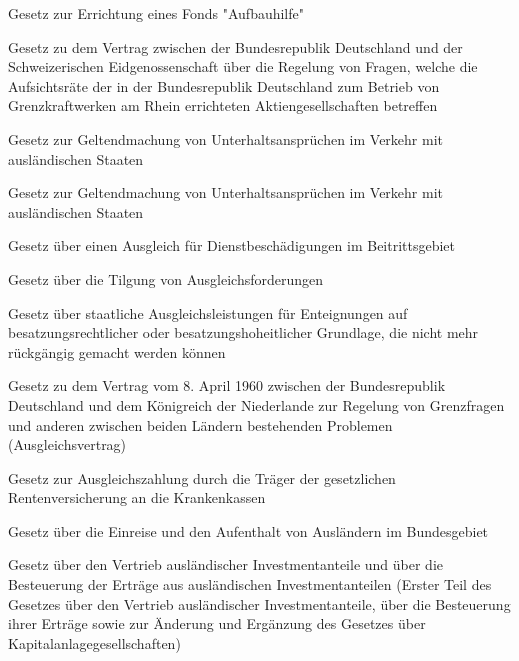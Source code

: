 \item[{AufhFG}] Gesetz zur Errichtung eines Fonds "Aufbauhilfe"

\item[{AufsRatAbkCHEG}] Gesetz zu dem Vertrag zwischen der Bundesrepublik Deutschland und der Schweizerischen Eidgenossenschaft über die Regelung von Fragen, welche die Aufsichtsräte der in der Bundesrepublik Deutschland zum Betrieb von Grenzkraftwerken am Rhein errichteten Aktiengesellschaften betreffen

\item[{AUG}] Gesetz zur Geltendmachung von Unterhaltsansprüchen im Verkehr mit ausländischen Staaten

\item[{AUG-2011}] Gesetz zur Geltendmachung von Unterhaltsansprüchen im Verkehr mit ausländischen Staaten

\item[{AusglBGG}] Gesetz über einen Ausgleich für Dienstbeschädigungen im Beitrittsgebiet

\item[{AusglFoG-1965}] Gesetz über die Tilgung von Ausgleichsforderungen

\item[{AusglLeistG}] Gesetz über staatliche Ausgleichsleistungen für Enteignungen auf besatzungsrechtlicher oder besatzungshoheitlicher Grundlage, die nicht mehr rückgängig gemacht werden können

\item[{AusglVtrNLDG}] Gesetz zu dem Vertrag vom 8. April 1960 zwischen der Bundesrepublik Deutschland und dem Königreich der Niederlande zur Regelung von Grenzfragen und anderen zwischen beiden Ländern bestehenden Problemen (Ausgleichsvertrag)

\item[{AusglZG}] Gesetz zur Ausgleichszahlung durch die Träger der gesetzlichen Rentenversicherung an die Krankenkassen

\item[{AuslG-1990}] Gesetz über die Einreise und den Aufenthalt von Ausländern im Bundesgebiet

\item[{AuslInvestmG}] Gesetz über den Vertrieb ausländischer Investmentanteile und über die Besteuerung der Erträge aus ausländischen Investmentanteilen (Erster Teil des Gesetzes über den Vertrieb ausländischer Investmentanteile, über die Besteuerung ihrer Erträge sowie zur Änderung und Ergänzung des Gesetzes über Kapitalanlagegesellschaften)

